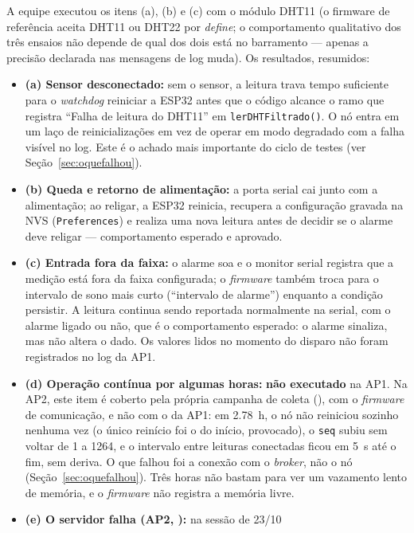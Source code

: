 A equipe executou os itens (a), (b) e (c) com o módulo DHT11 (o firmware de
referência aceita DHT11 ou DHT22 por \emph{define}; o comportamento
qualitativo dos três ensaios não depende de qual dos dois está no
barramento --- apenas a precisão declarada nas mensagens de log muda). Os
resultados, resumidos:

\begin{itemize}
  \item \textbf{(a) Sensor desconectado:} sem o sensor, a leitura trava
    tempo suficiente para o \emph{watchdog} reiniciar a ESP32 antes que o
    código alcance o ramo que registra \enquote{Falha de leitura do DHT11}
    em \texttt{lerDHTFiltrado()}. O nó entra em um laço de reinicializações
    em vez de operar em modo degradado com a falha visível no log. Este é
    o achado mais importante do ciclo de testes (ver
    Seção~\ref{sec:oquefalhou}).
  \item \textbf{(b) Queda e retorno de alimentação:} a porta serial cai
    junto com a alimentação; ao religar, a ESP32 reinicia, recupera a
    configuração gravada na NVS (\texttt{Preferences}) e realiza uma nova
    leitura antes de decidir se o alarme deve religar --- comportamento
    esperado e aprovado.
  \item \textbf{(c) Entrada fora da faixa:} o alarme soa e o monitor
    serial registra que a medição está fora da faixa configurada; o
    \emph{firmware} também troca para o intervalo de sono mais curto
    (\enquote{intervalo de alarme}) enquanto a condição persistir. A
    leitura continua sendo reportada normalmente na serial, com o alarme
    ligado ou não, que é o comportamento esperado: o alarme sinaliza, mas
    não altera o dado. Os valores lidos no momento do disparo não foram
    registrados no log da AP1.
  \item \textbf{(d) Operação contínua por algumas horas:} \textbf{não
    executado} na AP1. Na AP2, este item é coberto pela própria campanha
    de coleta (), com o \emph{firmware} de comunicação, e não com o
    da AP1: em \SI{2,78}{\hour}, o nó não reiniciou sozinho nenhuma vez (o
    único reinício foi o do início, provocado), o \texttt{seq} subiu sem
    voltar de 1 a \num{1264}, e o intervalo entre leituras conectadas
    ficou em \SI{5}{\second} até o fim, sem deriva. O que falhou foi a
    conexão com o \emph{broker}, não o nó (Seção~\ref{sec:oquefalhou}).
    Três horas não bastam para ver um vazamento lento de memória, e o
    \emph{firmware} não registra a memória livre.
  \item \textbf{(e) O servidor falha (AP2, ):} na sessão de 23/10

\end{itemize}
